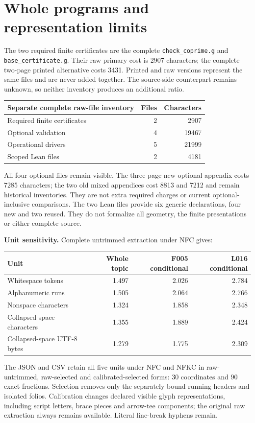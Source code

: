 \documentclass[a4paper,11pt]{article}
\begin{document}
\section*{Whole programs and representation limits}
The two required finite certificates are the complete
\texttt{check\_coprime.g} and \texttt{base\_certificate.g}. Their raw primary
cost is 2907 characters; the complete two-page printed alternative costs
3431. Printed and raw versions represent the same files and are never added
together. The source-side counterpart remains unknown, so neither inventory
produces an additional ratio.
\begin{center}\begin{tabular}{lrr}\toprule
Separate complete raw-file inventory &Files&Characters\\\midrule
Required finite certificates &2&2907\\
Optional validation &4&19467\\
Operational drivers &5&21999\\
Scoped Lean files &2&4181\\\bottomrule
\end{tabular}\end{center}
All four optional files remain visible. The three-page new optional appendix
costs 7285 characters; the two old mixed appendices cost 8813 and
7212 and remain historical inventories. They are not extra required
charges or current optional-inclusive comparisons. The two Lean files provide
six generic declarations, four new and two reused. They do not formalize all
geometry, the finite presentations or either complete source.

\textbf{Unit sensitivity.} Complete untrimmed extraction under NFC gives:
\begin{center}\small\begin{tabular}{lrrr}\toprule
Unit&Whole topic&F005 conditional&L016 conditional\\\midrule
Whitespace tokens & 1.497 & 2.026 & 2.784 \\
Alphanumeric runs & 1.505 & 2.064 & 2.766 \\
Nonspace characters & 1.324 & 1.858 & 2.348 \\
Collapsed-space characters & 1.355 & 1.889 & 2.424 \\
Collapsed-space UTF-8 bytes & 1.279 & 1.775 & 2.309 \\
\bottomrule\end{tabular}\end{center}
The JSON and CSV retain all five units under NFC and NFKC in raw-untrimmed,
raw-selected and calibrated-selected forms: 30 coordinates and 90 exact
fractions. Selection removes only the separately bound running headers and
isolated folios. Calibration changes declared visible glyph representations,
including script letters, brace pieces and arrow-tee components; the original
raw extraction always remains available. Literal line-break hyphens remain.
\end{document}
